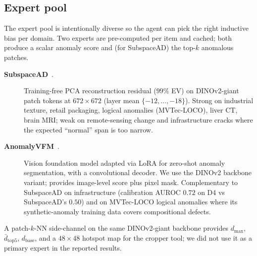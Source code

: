 \subsection{Expert pool}
\label{ssec:experts}
The expert pool is intentionally diverse so the agent can pick the right inductive bias per domain. Two experts are pre-computed per item and cached; both produce a scalar anomaly score and (for SubspaceAD) the top-$k$ anomalous patches.
\begin{description}
    \item[\textbf{SubspaceAD}~\citep{subspacead2026}.] Training-free PCA reconstruction residual ($99\%$ EV) on DINOv2-giant patch tokens at $672{\times}672$ (layer mean $\{-12,\dots,-18\}$). Strong on industrial texture, retail packaging, logical anomalies (MVTec-LOCO), liver CT, brain MRI; weak on remote-sensing change and infrastructure cracks where the expected ``normal'' span is too narrow.
    \item[\textbf{AnomalyVFM}~\citep{anomalyvfm2025}.] Vision foundation model adapted via LoRA for zero-shot anomaly segmentation, with a convolutional decoder. We use the DINOv2 backbone variant; provides image-level score plus pixel mask. Complementary to SubspaceAD on infrastructure (calibration AUROC $0.72$ on D4 vs SubspaceAD's $0.50$) and on MVTec-LOCO logical anomalies where its synthetic-anomaly training data covers compositional defects.
\end{description}
A patch-$k$-NN side-channel on the same DINOv2-giant backbone provides $d_{\max}$, $\bar{d}_{\text{top5}}$, $d_{\text{base}}$, and a $48{\times}48$ hotspot map for the cropper tool; we did not use it as a primary expert in the reported results.

